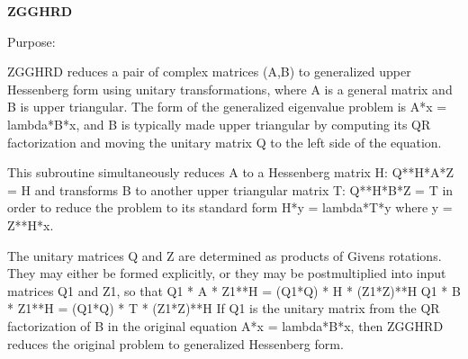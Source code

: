 {\bfseries Z\+G\+G\+H\+R\+D} 

 \begin{DoxyParagraph}{Purpose\+: }
\begin{DoxyVerb} ZGGHRD reduces a pair of complex matrices (A,B) to generalized upper
 Hessenberg form using unitary transformations, where A is a
 general matrix and B is upper triangular.  The form of the
 generalized eigenvalue problem is
    A*x = lambda*B*x,
 and B is typically made upper triangular by computing its QR
 factorization and moving the unitary matrix Q to the left side
 of the equation.

 This subroutine simultaneously reduces A to a Hessenberg matrix H:
    Q**H*A*Z = H
 and transforms B to another upper triangular matrix T:
    Q**H*B*Z = T
 in order to reduce the problem to its standard form
    H*y = lambda*T*y
 where y = Z**H*x.

 The unitary matrices Q and Z are determined as products of Givens
 rotations.  They may either be formed explicitly, or they may be
 postmultiplied into input matrices Q1 and Z1, so that
      Q1 * A * Z1**H = (Q1*Q) * H * (Z1*Z)**H
      Q1 * B * Z1**H = (Q1*Q) * T * (Z1*Z)**H
 If Q1 is the unitary matrix from the QR factorization of B in the
 original equation A*x = lambda*B*x, then ZGGHRD reduces the original
 problem to generalized Hessenberg form.\end{DoxyVerb}
 
\end{DoxyParagraph}

